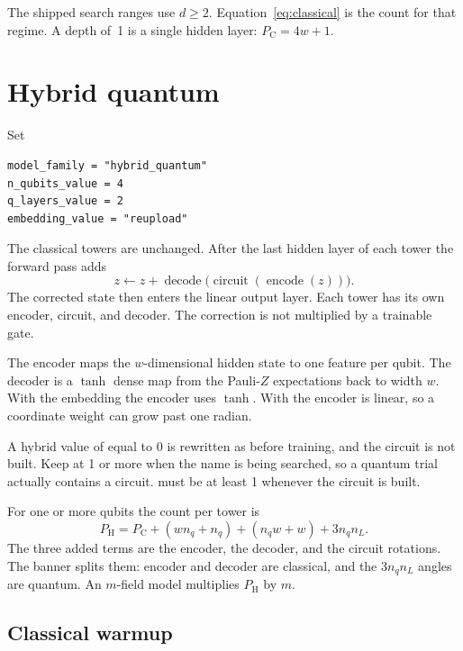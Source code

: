 The shipped search ranges use \(d\ge 2\).
Equation~\eqref{eq:classical} is the count for that regime.
A depth of~1 is a single hidden layer: \(P_{\mathrm{C}}=4w+1\).

\section{Hybrid quantum}
\label{sec:hybrid}

Set
\begin{lstlisting}
model_family = "hybrid_quantum"
n_qubits_value = 4
q_layers_value = 2
embedding_value = "reupload"
\end{lstlisting}
The classical towers are unchanged.
After the last hidden layer of each tower the forward pass adds
\begin{equation}
\label{eq:hybrid}
z \leftarrow z +
\operatorname{decode}\!\big(
\operatorname{circuit}(\operatorname{encode}(z))
\big).
\end{equation}
The corrected state then enters the linear output layer.
Each tower has its own encoder, circuit, and decoder.
The correction is not multiplied by a trainable gate.

The encoder maps the \(w\)-dimensional hidden state to one feature per qubit.
The decoder is a \(\tanh\) dense map from the Pauli-\(Z\) expectations back to width \(w\).
With the  embedding the encoder uses \(\tanh\).
With  the encoder is linear, so a coordinate weight can grow past one radian.

A hybrid value of  equal to 0 is rewritten as  before training, and the circuit is not built.
Keep  at 1 or more when the name is being searched, so a quantum trial actually contains a circuit.
 must be at least 1 whenever the circuit is built.

For one or more qubits the count per tower is
\begin{equation}
\label{eq:hybrid-count}
P_{\mathrm{H}}
= P_{\mathrm{C}}
+ (wn_{q}+n_{q})
+ (n_{q}w+w)
+ 3n_{q}n_{L}.
\end{equation}
The three added terms are the encoder, the decoder, and the circuit rotations.
The banner splits them: encoder and decoder are classical, and the \(3n_{q}n_{L}\) angles are quantum.
An \(m\)-field model multiplies \(P_{\mathrm{H}}\) by \(m\).

\subsection{Classical warmup}

